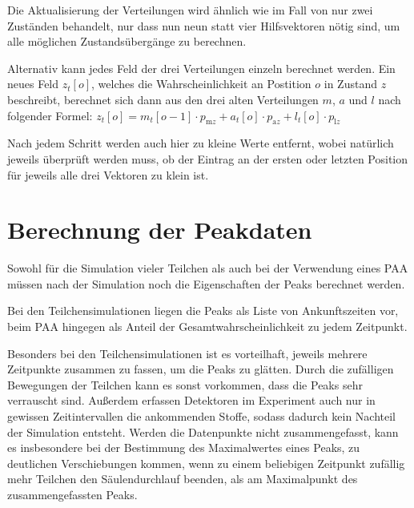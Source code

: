 Die Aktualisierung der Verteilungen wird ähnlich wie im Fall von nur zwei Zuständen behandelt, nur dass nun neun statt vier Hilfsvektoren nötig sind, um alle möglichen Zustandsübergänge zu berechnen. 

Alternativ kann jedes Feld der drei Verteilungen einzeln berechnet werden. Ein neues Feld $z_t[o]$, welches die Wahrscheinlichkeit an Postition $o$ in Zustand $z$ beschreibt, berechnet sich dann aus den drei alten Verteilungen $m$, $a$ und $l$ nach folgender Formel:
$z_t[o] = m_t[o-1] \cdot p_{\text{m}z} + a_t[o] \cdot p_{\text{a}z} + l_t[o] \cdot p_{\text{l}z} $


Nach jedem Schritt werden auch hier zu kleine Werte entfernt, wobei natürlich jeweils überprüft werden muss, ob der Eintrag an der ersten oder letzten Position für jeweils alle drei Vektoren zu klein ist.

% 


\section{Berechnung der Peakdaten}
Sowohl für die Simulation vieler Teilchen als auch bei der Verwendung eines PAA müssen nach der Simulation noch die Eigenschaften der Peaks berechnet werden. 

Bei den Teilchensimulationen liegen die Peaks als Liste von Ankunftszeiten vor, beim PAA hingegen als Anteil der Gesamtwahrscheinlichkeit zu jedem Zeitpunkt. 

Besonders bei den Teilchensimulationen ist es vorteilhaft, jeweils mehrere Zeitpunkte zusammen zu fassen, um die Peaks zu glätten. Durch die zufälligen Bewegungen der Teilchen kann es sonst vorkommen, dass die Peaks sehr verrauscht sind. Außerdem erfassen Detektoren im Experiment auch nur in gewissen Zeitintervallen die ankommenden Stoffe, sodass dadurch kein Nachteil der Simulation entsteht.
Werden die Datenpunkte nicht zusammengefasst, kann es insbesondere bei der Bestimmung des Maximalwertes eines Peaks, zu deutlichen Verschiebungen kommen, wenn zu einem beliebigen Zeitpunkt zufällig mehr Teilchen den Säulendurchlauf beenden, als am Maximalpunkt des zusammengefassten Peaks.

